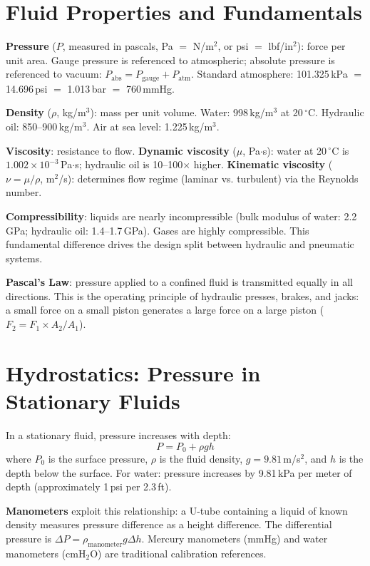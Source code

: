 \documentclass[11pt,letterpaper,twoside,openany]{book}
\newcommand{\degC}{\ensuremath{{}^{\circ}\text{C}}}
\begin{document}
\section{Fluid Properties and Fundamentals}

\textbf{Pressure} ($P$, measured in pascals, Pa $= $ N/m$^2$, or psi $=$ lbf/in$^2$): force per unit area. Gauge pressure is referenced to atmospheric; absolute pressure is referenced to vacuum: $P_{\text{abs}} = P_{\text{gauge}} + P_{\text{atm}}$. Standard atmosphere: 101.325\,kPa $=$ 14.696\,psi $=$ 1.013\,bar $=$ 760\,mmHg.

\textbf{Density} ($\rho$, kg/m$^3$): mass per unit volume. Water: 998\,kg/m$^3$ at 20\,\degC{}. Hydraulic oil: 850--900\,kg/m$^3$. Air at sea level: 1.225\,kg/m$^3$.

\textbf{Viscosity}: resistance to flow. \textbf{Dynamic viscosity} ($\mu$, Pa$\cdot$s): water at 20\,\degC{} is $1.002 \times 10^{-3}$\,Pa$\cdot$s; hydraulic oil is 10--100$\times$ higher. \textbf{Kinematic viscosity} ($\nu = \mu/\rho$, m$^2$/s): determines flow regime (laminar vs. turbulent) via the Reynolds number.

\textbf{Compressibility}: liquids are nearly incompressible (bulk modulus of water: 2.2\,GPa; hydraulic oil: 1.4--1.7\,GPa). Gases are highly compressible. This fundamental difference drives the design split between hydraulic and pneumatic systems.

\textbf{Pascal's Law}: pressure applied to a confined fluid is transmitted equally in all directions. This is the operating principle of hydraulic presses, brakes, and jacks: a small force on a small piston generates a large force on a large piston ($F_2 = F_1 \times A_2/A_1$).

\section{Hydrostatics: Pressure in Stationary Fluids}

In a stationary fluid, pressure increases with depth:
\begin{equation}
P = P_0 + \rho g h
\end{equation}
where $P_0$ is the surface pressure, $\rho$ is the fluid density, $g = 9.81$\,m/s$^2$, and $h$ is the depth below the surface. For water: pressure increases by 9.81\,kPa per meter of depth (approximately 1\,psi per 2.3\,ft).

\textbf{Manometers} exploit this relationship: a U-tube containing a liquid of known density measures pressure difference as a height difference. The differential pressure is $\Delta P = \rho_{\text{manometer}} g \Delta h$. Mercury manometers (mmHg) and water manometers (cmH$_2$O) are traditional calibration references.
\end{document}
